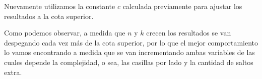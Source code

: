 Nuevamente utilizamos la constante $c$ calculada previamente para ajustar los resultados a la cota superior.

Como podemos observar, a medida que $n$ y $k$ crecen los resultados se van despegando cada vez m\'as de la cota superior, por lo que el mejor comportamiento lo vamos encontrando a medida que se van incrementando ambas variables de las cuales depende la complejidad, o sea, las casillas por lado y la cantidad de saltos extra.

